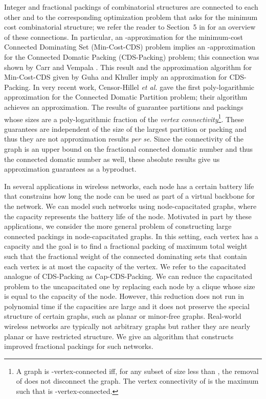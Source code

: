 \documentclass[11pt]{article}
\def\etal{\emph{et al.}\xspace}
\def\prob#1{\textsf{\textup{#1}}\xspace}
\def\CDSpack{\prob{CDS-Packing}}
\def\capCDSpack{\prob{Cap-CDS-Packing}}
\def\minCDS{\prob{Min-Cost-CDS}}
\begin{document}
Integer and fractional packings of combinatorial structures are
connected to each other and to the corresponding optimization problem
that asks for the minimum cost combinatorial structure; we refer the
reader to Section~{5} in \cite{CalinescuCV09} for an overview of
these connections. In particular, an -approximation for the
minimum-cost \prob{Connected Dominating Set} (\minCDS) problem implies an
-approximation for the \prob{Connected Domatic Packing}
(\CDSpack) problem; this connection was shown by
Carr and Vempala \cite{CarrV02}.  This result and the 
approximation algorithm for \minCDS given by Guha and Khuller
\cite{GuhaK98} imply an  approximation for \CDSpack. In
very recent work, Censor-Hillel \etal \cite{CHGK} gave the first
poly-logarithmic approximation for the \prob{Connected Domatic
Partition} problem; their algorithm achieves
an  approximation. The results of \cite{CHGK} guarantee
partitions and packings whose sizes are a poly-logarithmic fraction
of the \emph{vertex connectivity}\footnote{A graph  is
-vertex-connected iff, for any subset  of size
less than , the removal of  does not disconnect the graph. The
vertex connectivity of  is the maximum  such that  is
-vertex-connected.}. These guarantees are independent of the size
of the largest partition or packing and thus they are not
approximation results \emph{per se}.  Since the connectivity of the
graph is an upper bound on the fractional connected domatic number
and thus the connected domatic number as well, these absolute results
give us approximation guarantees as a byproduct.

In several applications in wireless networks, each node has a certain
battery life that constrains how long the node can be used as part of
a virtual backbone for the network. We can model such networks using
node-capacitated graphs, where the capacity represents the battery
life of the node. Motivated in part by these applications, we
consider the more general problem of constructing large connected
packings in node-capacitated graphs. In this setting, each vertex 
has a capacity  and the goal is to find a fractional
packing of maximum total weight such that the fractional weight of
the connected dominating sets that contain each vertex is at most the
capacity of the vertex. We refer to the capacitated analogue of
\CDSpack as \capCDSpack.  We can reduce the capacitated problem to
the uncapacitated one by replacing each node by a clique whose size
is equal to the capacity of the node. However, this reduction does
not run in polynomial time if the capacities are large and it does
not preserve the special structure of certain graphs, such as planar
or minor-free graphs.  Real-world wireless networks are typically not
arbitrary graphs but rather they are nearly planar or have restricted
structure. We give an algorithm that constructs improved fractional
packings for such networks.
\end{document}
